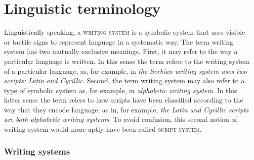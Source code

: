 \section{Linguistic terminology}
\label{linguistic-terminology}

Linguistically speaking, a \textsc{writing system} is a symbolic system that
uses visible or tactile signs to represent language in a systematic way. The
term writing system has two mutually exclusive meanings. First, it may
refer to the way a particular language is written. In this sense the term refers
to the writing system of a particular language, as, for example, in \emph{the
Serbian writing system uses two scripts: Latin and Cyrillic}. Second, the term
writing system may also refer to a type of symbolic system as, for example, in
\emph{alphabetic writing system}. In this latter sense the term refers to how
scripts have been classified according to the way that they encode language, as
in, for example, \emph{the Latin and Cyrillic scripts are both alphabetic
writing systems}. To avoid confusion, this second notion of writing system
would more aptly have been called \textsc{script system}. 

\subsubsection*{Writing systems}

